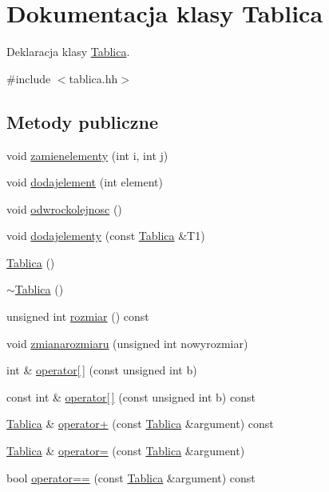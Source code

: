 \hypertarget{class_tablica}{\section{Dokumentacja klasy Tablica}
\label{class_tablica}
}


Deklaracja klasy \hyperlink{class_tablica}{Tablica}.  




{\ttfamily \#include $<$tablica.\-hh$>$}

\subsection*{Metody publiczne}
\begin{DoxyCompactItemize}
\item 
void \hyperlink{class_tablica_a4f69d95776f0ea1454a87bb72562713b}{zamienelementy} (int i, int j)
\item 
void \hyperlink{class_tablica_ad4d99dc2ca07689167d703ba24a4dab2}{dodajelement} (int element)
\item 
void \hyperlink{class_tablica_ae63b8d381eb4f6a19cae52241228ae07}{odwrockolejnosc} ()
\item 
void \hyperlink{class_tablica_ac5b21c0e98c4f5ac5c728b99f092b112}{dodajelementy} (const \hyperlink{class_tablica}{Tablica} \&T1)
\item 
\hyperlink{class_tablica_a5f484e7b0478e1ff9b62e894f9d7b28d}{Tablica} ()
\item 
\hyperlink{class_tablica_a6e1e50608ad0f9f9626d0b1fb698b180}{$\sim$\-Tablica} ()
\item 
unsigned int \hyperlink{class_tablica_ae95a62ea4245e732b96c110c0fc53532}{rozmiar} () const 
\item 
void \hyperlink{class_tablica_a4e743bdbb74647717d63015894dfae8d}{zmianarozmiaru} (unsigned int nowyrozmiar)
\item 
int \& \hyperlink{class_tablica_aa73e557bfd1a0283d94b594f159cf6d1}{operator\mbox{[}$\,$\mbox{]}} (const unsigned int b)
\item 
const int \& \hyperlink{class_tablica_a16a2591adbcce8add22be48ff8f1a830}{operator\mbox{[}$\,$\mbox{]}} (const unsigned int b) const 
\item 
\hyperlink{class_tablica}{Tablica} \& \hyperlink{class_tablica_a469a403559ecce37e70c8adc67a0fc0d}{operator+} (const \hyperlink{class_tablica}{Tablica} \&argument) const 
\item 
\hyperlink{class_tablica}{Tablica} \& \hyperlink{class_tablica_af42a963c962250d20240811a0defd6b4}{operator=} (const \hyperlink{class_tablica}{Tablica} \&argument)
\item 
bool \hyperlink{class_tablica_a9416cdb689731ec64d440de10d944549}{operator==} (const \hyperlink{class_tablica}{Tablica} \&argument) const 
\end{DoxyCompactItemize}


